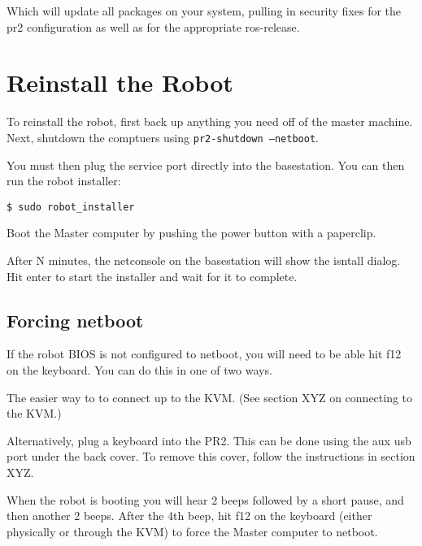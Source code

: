 Which will update all packages on your system, pulling in security fixes for
the pr2 configuration as well as for the appropriate ros-release.


\section{Reinstall the Robot}

To reinstall the robot, first back up anything you need off of the
master machine.  Next, shutdown the comptuers using
\texttt{pr2-shutdown --netboot}.

You must then plug the service port directly into the basestation.
You can then run the robot installer:

\begin{verbatim}
$ sudo robot_installer
\end{verbatim}

Boot the Master computer by pushing the power button with a paperclip.

After N minutes, the netconsole on the basestation will show the
isntall dialog.  Hit enter to start the installer and wait for it to
complete.

\subsection{Forcing netboot}

If the robot BIOS is not configured to netboot, you will need to be
able hit f12 on the keyboard.  You can do this in one of two ways.

The easier way to to connect up to the KVM.  (See section XYZ on connecting to the KVM.)

Alternatively, plug a keyboard into the PR2.  This can be done using
the aux usb port under the back cover.  To remove this cover, follow
the instructions in section XYZ.

When the robot is booting you will hear 2 beeps followed by a short
pause, and then another 2 beeps.  After the 4th beep, hit f12 on the
keyboard (either physically or through the KVM) to force the Master
computer to netboot.

